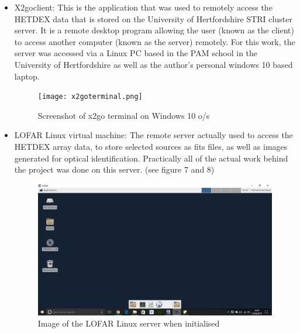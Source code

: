 \documentclass{article}
\begin{document}
\begin{itemize}
    \item X2goclient: This is the application that was used to remotely access the HETDEX data that is stored on the University of Hertfordshire STRI cluster server. It is a remote desktop program allowing the user (known as the client) to access another computer (known as the server) remotely. For this work, the server was accessed via a Linux PC based in the PAM school in the University of Hertfordshire as well as the author's personal windows 10 based laptop.
    
    \begin{figure}
        \centering
        \texttt{[image: x2goterminal.png]}
        \caption{Screenshot of x2go terminal on Windows 10 o/s}
        \label{fig:x2go}    
    \end{figure}
    
    \item LOFAR Linux virtual machine: The remote server actually used to access the HETDEX array data, to store selected sources as fits files, as well as images generated for optical identification. Practically all of the actual work behind the project was done on this server. (see figure 7 and 8)
    
    \begin{figure}
        \centering
        \includegraphics[scale = 0.3]{LOFARclient.png}
        \caption{Image of the LOFAR Linux server when initialised}
    \end{figure}


\end{itemize}
\end{document}
